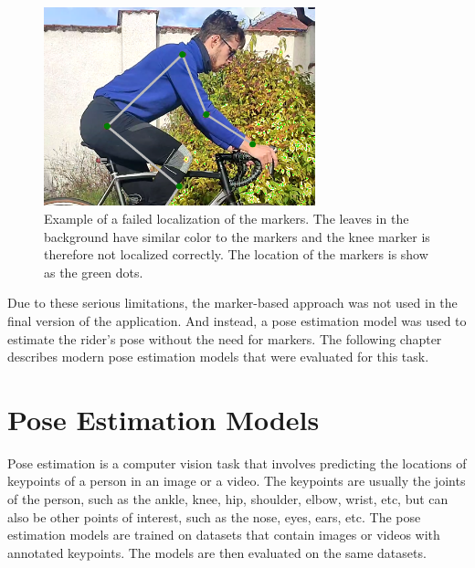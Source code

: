 \begin{figure}[htb]
    \centering
    \includegraphics[width=0.7\textwidth]{obrazky-figures/failed_localization_crop.png}
    \caption{Example of a failed localization of the markers. The leaves in the background have similar color to the markers and the knee marker is therefore not localized correctly. The location of the markers is show as the green dots.}
    \label{fig:failed_localization}
\end{figure}

Due to these serious limitations, the marker-based approach was not used in the final version of the application. And instead, a pose estimation model was used to estimate the rider's pose without the need for markers. The following chapter describes modern pose estimation models that were evaluated for this task.




\chapter{Pose Estimation Models}
\label{ch:pose_estimation}



Pose estimation is a computer vision task that involves predicting the locations of keypoints of a person in an image or a video. The keypoints are usually the joints of the person, such as the ankle, knee, hip, shoulder, elbow, wrist, etc, but can also be other points of interest, such as the nose, eyes, ears, etc. The pose estimation models are trained on datasets that contain images or videos with annotated keypoints. The models are then evaluated on the same datasets.

